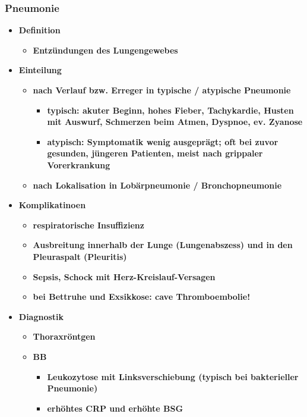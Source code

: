 		\subsubsection*{Pneumonie}
			\begin{itemize}
				\item \textbf{Definition}
					\begin{itemize}
						\item \textbf{Entzündungen des Lungengewebes}
					\end{itemize}
				\item \textbf{Einteilung}
					\begin{itemize}
						\item \textbf{nach Verlauf bzw. Erreger in typische / atypische Pneumonie}
							\begin{itemize}
								\item \textbf{typisch: akuter Beginn, hohes Fieber, Tachykardie, Husten mit Auswurf, Schmerzen beim Atmen, Dyspnoe, ev. Zyanose}
								\item \textbf{atypisch: Symptomatik wenig ausgeprägt; oft bei zuvor gesunden, jüngeren Patienten, meist nach grippaler Vorerkrankung}
							\end{itemize}
						\item \textbf{nach Lokalisation in Lobärpneumonie / Bronchopneumonie}
					\end{itemize}
				\item \textbf{Komplikatinoen}
					\begin{itemize}
						\item \textbf{respiratorische Insuffizienz}
						\item \textbf{Ausbreitung innerhalb der Lunge (Lungenabszess) und in den Pleuraspalt (Pleuritis)}
						\item \textbf{Sepsis, Schock mit Herz-Kreislauf-Versagen}
						\item \textbf{bei Bettruhe und Exsikkose: cave Thromboembolie!}
					\end{itemize}
				\item \textbf{Diagnostik}
					\begin{itemize}
						\item \textbf{Thoraxröntgen}
						\item \textbf{BB}
							\begin{itemize}
								\item \textbf{Leukozytose mit Linksverschiebung (typisch bei bakterieller Pneumonie)}
								\item \textbf{erhöhtes CRP und erhöhte BSG}

\end{itemize}
\end{itemize}
\end{itemize}
